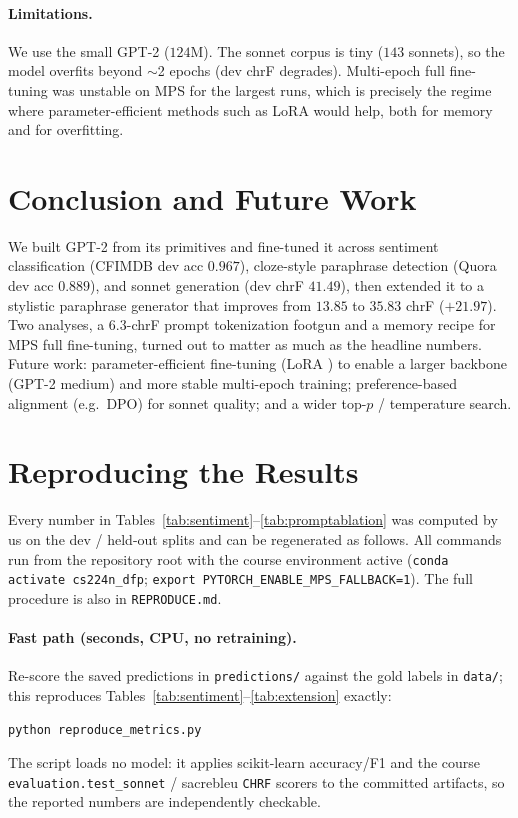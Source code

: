 \documentclass[10pt,twocolumn]{article}
\begin{document}
\paragraph{Limitations.}
We use the small GPT-2 ($124$M). The sonnet corpus is tiny ($143$ sonnets), so
the model overfits beyond $\sim$2 epochs (dev chrF degrades). Multi-epoch full
fine-tuning was unstable on MPS for the largest runs, which is precisely the
regime where parameter-efficient methods such as LoRA \cite{hu2022lora} would
help, both for memory and for overfitting.

\section{Conclusion and Future Work}
We built GPT-2 from its primitives and fine-tuned it across sentiment
classification (CFIMDB dev acc $0.967$), cloze-style paraphrase detection (Quora
dev acc $0.889$), and sonnet generation (dev chrF $41.49$), then extended it to a
stylistic paraphrase generator that improves from $13.85$ to $35.83$ chrF
($+21.97$). Two analyses, a $6.3$-chrF prompt tokenization footgun and a memory
recipe for MPS full fine-tuning, turned out to matter as much as the headline
numbers. Future work: parameter-efficient fine-tuning (LoRA \cite{hu2022lora}) to
enable a larger backbone (GPT-2 medium) and more stable multi-epoch training;
preference-based alignment (e.g.\ DPO) for sonnet quality; and a wider top-$p$ /
temperature search.

\appendix
\section{Reproducing the Results}
\label{app:repro}
Every number in Tables~\ref{tab:sentiment}--\ref{tab:promptablation} was computed
by us on the dev / held-out splits and can be regenerated as follows. All commands
run from the repository root with the course environment active
(\texttt{conda activate cs224n\_dfp};
\texttt{export PYTORCH\_ENABLE\_MPS\_FALLBACK=1}). The full procedure is also in
\texttt{REPRODUCE.md}.

\paragraph{Fast path (seconds, CPU, no retraining).} Re-score the saved
predictions in \texttt{predictions/} against the gold labels in \texttt{data/};
this reproduces Tables~\ref{tab:sentiment}--\ref{tab:extension} exactly:
\begin{lstlisting}[language=bash]
python reproduce_metrics.py
\end{lstlisting}
The script loads no model: it applies scikit-learn accuracy/F1 and the course
\texttt{evaluation.test\_sonnet} / sacrebleu \texttt{CHRF} scorers to the
committed artifacts, so the reported numbers are independently checkable.
\end{document}
